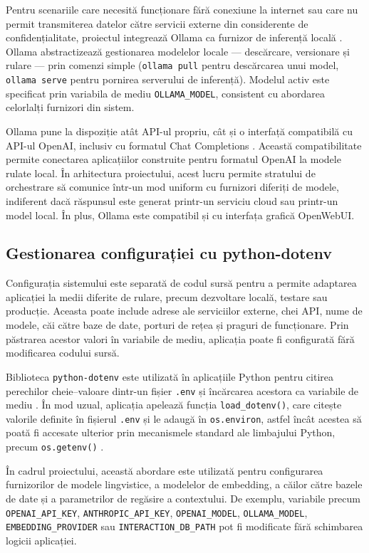 \documentclass[12pt, a4paper, oneside, romanian]{teza-upb}
\begin{document}
Pentru scenariile care necesită funcționare fără conexiune la internet sau care 
nu permit transmiterea datelor către servicii externe din considerente de 
confidențialitate, proiectul integrează Ollama ca furnizor de inferență locală 
\cite{ollama_doc}. Ollama abstractizează gestionarea modelelor locale — 
descărcare, versionare și rulare — prin comenzi simple (\texttt{ollama pull} 
pentru descărcarea unui model, \texttt{ollama serve} pentru pornirea serverului 
de inferență). Modelul activ este specificat prin variabila de mediu 
\texttt{OLLAMA\_MODEL}, consistent cu abordarea celorlalți furnizori din sistem.


Ollama pune la dispoziție atât API-ul propriu, cât și o interfață compatibilă cu API-ul OpenAI, inclusiv cu formatul Chat Completions \cite{ollama_openai_compatibility}. Această compatibilitate permite conectarea aplicațiilor construite pentru formatul OpenAI la modele rulate local. În arhitectura proiectului, acest lucru permite stratului de orchestrare să comunice într-un mod uniform cu furnizori diferiți de modele, indiferent dacă răspunsul este generat printr-un serviciu cloud sau printr-un model local. În plus, Ollama este compatibil și cu interfața grafică OpenWebUI.


\subsection{Gestionarea configurației cu python-dotenv}

Configurația sistemului este separată de codul sursă pentru a permite adaptarea aplicației la medii diferite de rulare, precum dezvoltare locală, testare sau producție. Aceasta poate include adrese ale serviciilor externe, chei API, nume de modele, căi către baze de date, porturi de rețea și praguri de funcționare. Prin păstrarea acestor valori în variabile de mediu, aplicația poate fi configurată fără modificarea codului sursă.

Biblioteca \texttt{python-dotenv} este utilizată în aplicațiile Python pentru citirea perechilor cheie--valoare dintr-un fișier \texttt{.env} și încărcarea acestora ca variabile de mediu \cite{python_dotenv_doc}. În mod uzual, aplicația apelează funcția \texttt{load\_dotenv()}, care citește valorile definite în fișierul \texttt{.env} și le adaugă în \texttt{os.environ}, astfel încât acestea să poată fi accesate ulterior prin mecanismele standard ale limbajului Python, precum \texttt{os.getenv()} \cite{python_dotenv_doc}.

În cadrul proiectului, această abordare este utilizată pentru configurarea furnizorilor de modele lingvistice, a modelelor de embedding, a căilor către bazele de date și a parametrilor de regăsire a contextului. De exemplu, variabile precum \texttt{OPENAI\_API\_KEY}, \texttt{ANTHROPIC\_API\_KEY}, \texttt{OPENAI\_MODEL}, \texttt{OLLAMA\_MODEL}, \texttt{EMBEDDING\_PROVIDER} sau \texttt{INTERACTION\_DB\_PATH} pot fi modificate fără schimbarea logicii aplicației.
\end{document}
